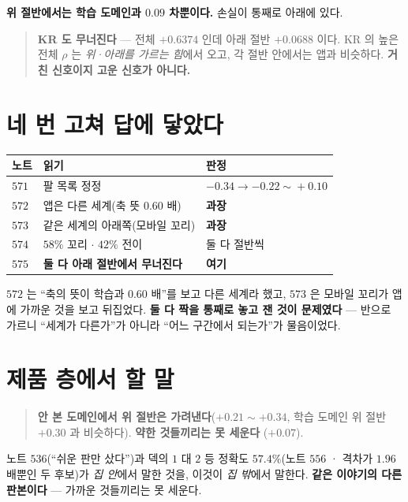 \documentclass[11pt]{article}
\begin{document}
\textbf{위 절반에서는 학습 도메인과 $0.09$ 차뿐이다.} 손실이 통째로 아래에
있다.

\begin{quote}
\textbf{KR 도 무너진다} --- 전체 $+0.6374$ 인데 아래 절반 $+0.0688$ 이다.
KR 의 높은 전체 $\rho$ 는 \emph{위·아래를 가르는 힘}에서 오고, 각 절반
안에서는 앱과 비슷하다. \textbf{거친 신호이지 고운 신호가 아니다.}
\end{quote}

\section{네 번 고쳐 답에 닿았다}

\begin{center}
\begin{tabular}{lll}
\hline
노트 & 읽기 & 판정 \\
\hline
$571$ & 팔 목록 정정 & $-0.34 \to -0.22\!\sim\!+0.10$ \\
$572$ & 앱은 다른 세계(축 뜻 $0.60$ 배) & \textbf{과장} \\
$573$ & 같은 세계의 아래쪽(모바일 꼬리) & \textbf{과장} \\
$574$ & $58\%$ 꼬리 $\cdot$ $42\%$ 전이 & 둘 다 절반씩 \\
\textbf{$575$} & \textbf{둘 다 아래 절반에서 무너진다} & \textbf{여기} \\
\hline
\end{tabular}
\end{center}

$572$ 는 ``축의 뜻이 학습과 $0.60$ 배''를 보고 다른 세계라 했고, $573$ 은
모바일 꼬리가 앱에 가까운 것을 보고 뒤집었다. \textbf{둘 다 짝을 통째로 놓고
잰 것이 문제였다} --- 반으로 가르니 ``세계가 다른가''가 아니라 ``어느
구간에서 되는가''가 물음이었다.

\section{제품 층에서 할 말}

\begin{quote}
\textbf{안 본 도메인에서 위 절반은 가려낸다}($+0.21 \sim +0.34$, 학습
도메인 위 절반 $+0.30$ 과 비슷하다). \textbf{약한 것들끼리는 못 세운다}
($+0.07$).
\end{quote}

노트 $536$(``쉬운 판만 샀다'')과 덱의 $1$ 대 $2$ 등 정확도 $57.4\%$(노트
$556$ · 격차가 $1.96$ 배뿐인 두 후보)가 \emph{집 안}에서 말한 것을, 이것이
\emph{집 밖}에서 말한다. \textbf{같은 이야기의 다른 판본이다} --- 가까운
것들끼리는 못 세운다.
\end{document}
